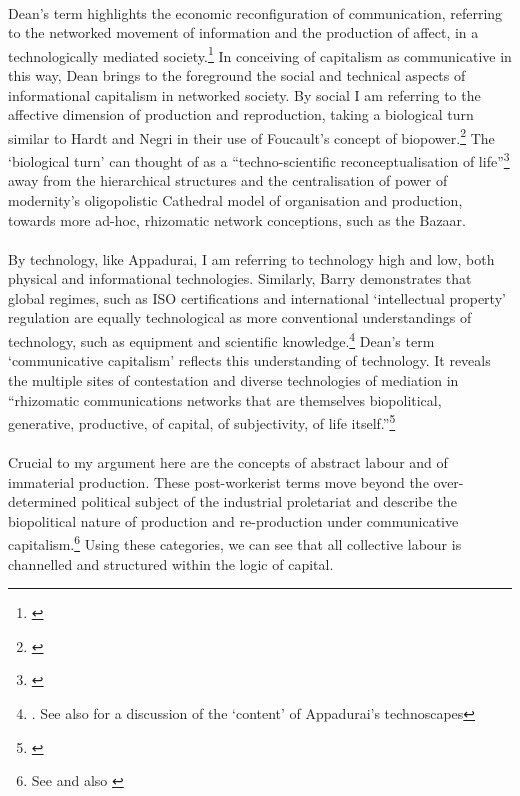 \documentclass[11pt,titlepage]{book}
\begin{document}
\paragraph{}Dean's term highlights the economic reconfiguration of communication, referring to the networked movement of information and the production of affect, in a technologically mediated society.\footnote{\cite[pp. 272-273]{dean:2005cc}} In conceiving of capitalism as communicative in this way, Dean brings to the foreground the social and technical aspects of informational capitalism in networked society. By social I am referring to the affective dimension of production and reproduction, taking a biological turn similar to Hardt and Negri in their use of Foucault's concept of biopower.\footnote{\cite[p. 28]{Hardt:2001jl}} The `biological turn' can thought of as a ``techno-scientific reconceptualisation of life''\footnote{\cite[p. 101]{Terranova:2004ly}} away from the hierarchical structures and the centralisation of power of modernity's oligopolistic Cathedral model of organisation and production, towards more ad-hoc, rhizomatic network conceptions, such as the Bazaar.

\paragraph{}By technology, like Appadurai, I am referring to technology high and low, both physical and informational technologies. Similarly, Barry demonstrates that global regimes, such as ISO certifications and international `intellectual property' regulation are equally technological as more conventional understandings of technology, such as equipment and scientific knowledge.\footnote{\cite[p. 34]{Appadurai:1996lp}. See also \cite[Chapter 2, \textit{Technological Zones}]{Barry:2001ff} for a discussion of the `content' of Appadurai's technoscapes} Dean's term `communicative capitalism' reflects this understanding of technology. It reveals the multiple sites of contestation and diverse technologies of mediation in ``rhizomatic communications networks that are themselves biopolitical, generative, productive, of capital, of subjectivity, of life itself.''\footnote{\cite[p. 285]{dean:2005cc}}

\paragraph{}Crucial to my argument here are the concepts of abstract labour and of immaterial production. These post-workerist terms move beyond the over-determined political subject of the industrial proletariat and describe the biopolitical nature of production and re-production under communicative capitalism.\footnote{See \cite[Chapter 3 \textit{Free Labour}]{Terranova:2004ly} and also \cite{Wright:2005wb}} Using these categories, we can see that all collective labour is channelled and structured within the logic of capital.
\end{document}
